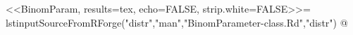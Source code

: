 <<BinomParam, results=tex, echo=FALSE, strip.white=FALSE>>=
lstinputSourceFromRForge("distr","man","BinomParameter-class.Rd","distr")
@
